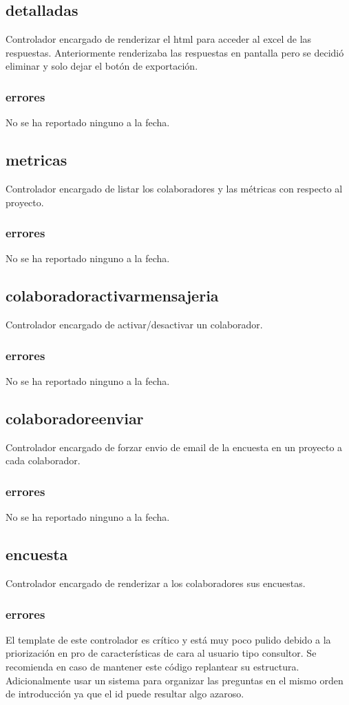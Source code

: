\documentclass[10pt,a4paper]{book}
\begin{document}
	\subsection{detalladas}
	Controlador encargado de renderizar el html para acceder al excel de las respuestas. Anteriormente renderizaba las respuestas en pantalla pero se decidió eliminar y solo dejar el botón  de exportación.
	\subsubsection{errores}
	No se ha reportado ninguno a la fecha.

	\subsection{metricas}
	Controlador encargado de listar los colaboradores y las métricas con respecto al proyecto.
	\subsubsection{errores}
	No se ha reportado ninguno a la fecha.

	\subsection{colaboradoractivarmensajeria}
	Controlador encargado de activar/desactivar un colaborador.
	\subsubsection{errores}
	No se ha reportado ninguno a la fecha.

	\subsection{colaboradoreenviar}
	Controlador encargado de forzar envio de email de la encuesta en un proyecto a cada colaborador.
	\subsubsection{errores}
	No se ha reportado ninguno a la fecha.

	\subsection{encuesta}
	Controlador encargado de renderizar a los colaboradores sus encuestas.
	\subsubsection{errores}
	El template de este controlador es crítico y está muy poco pulido debido a la priorización en pro de características de cara al usuario tipo consultor. Se recomienda en caso de mantener este código replantear su estructura. Adicionalmente usar un sistema para organizar las preguntas en el mismo orden de introducción ya que el id puede resultar algo azaroso.
	
\end{document}
